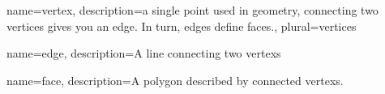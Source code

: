 {
  name=vertex,
  description={a single point used in geometry, connecting two vertices gives you an \gls{edge}. In turn, \glspl{edge} define \glspl{face}.},
  plural=vertices
}

{
  name=edge,
  description={A line connecting two \glspl{vertex}}
}

{
  name=face,
  description={A polygon described by connected \glspl{vertex}.}
}